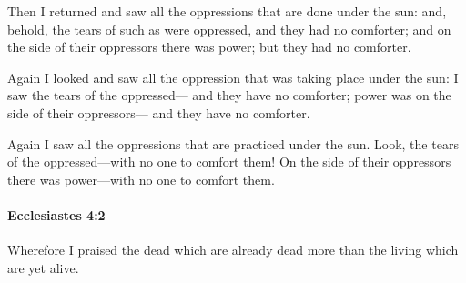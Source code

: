 			\begin{versebox}
					\item[BHS] 
					\item[LXX] 
					\item[ASV] Then I returned and saw all the oppressions that are done under the sun: and, behold, the tears of such as were oppressed, and they had no comforter; and on the side of their oppressors there was power; but they had no comforter.
					\item[NIV] Again I looked and saw all the oppression that was taking place under the sun: I saw the tears of the oppressed— and they have no comforter; power was on the side of their oppressors— and they have no comforter.
					\item[NRSV] Again I saw all the oppressions that are practiced under the sun. Look, the tears of the oppressed—with no one to comfort them! On the side of their oppressors there was power—with no one to comfort them.
			\end{versebox}

		\paragraph{Ecclesiastes 4:2} %
			\label{ECCLESIASTES-4-2}

			Wherefore I praised the dead which are already dead more than the living which are yet alive.

